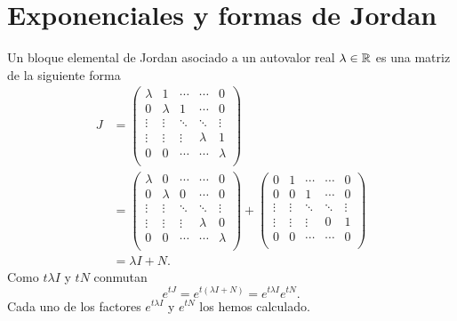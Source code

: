 \section{Exponenciales y formas de Jordan}

Un bloque elemental  de Jordan asociado a un autovalor real $\lambda\in\mathbb{R}$ es una matriz  de la siguiente forma
\[
\begin{split}
 J&=
   \begin{pmatrix}
    \lambda & 1        & \cdots& \cdots  &0\\
    0         &\lambda  &  1      &\cdots &0 \\
    \vdots    & \vdots   &\ddots  &\ddots&\vdots \\
     \vdots    & \vdots  & \vdots   &\lambda  &1\\
      0    & 0   & \cdots& \cdots &\lambda\\   
   \end{pmatrix}\\
   &=
      \begin{pmatrix}
    \lambda & 0        & \cdots& \cdots  &0\\
    0         &\lambda  &  0      &\cdots &0 \\
    \vdots    & \vdots   &\ddots  &\ddots&\vdots \\
     \vdots    & \vdots  & \vdots   &\lambda  &0\\
      0    & 0   & \cdots& \cdots &\lambda\\   
   \end{pmatrix}
  +
      \begin{pmatrix}
    0 & 1        & \cdots& \cdots  &0\\
    0         &0  &  1      &\cdots &0 \\
    \vdots    & \vdots   &\ddots  &\ddots&\vdots \\
     \vdots    & \vdots  & \vdots   &0  &1\\
      0    & 0   & \cdots& \cdots &0\\   
   \end{pmatrix}\\
   &=\lambda I+N.
\end{split}
\]
Como $t\lambda I$ y $tN$ conmutan
\[e^{tJ}=e^{t(\lambda I+N)}=e^{t\lambda I}e^{tN}.\]
Cada uno de los factores $e^{t\lambda I}$ y $e^{tN}$ los hemos calculado. 

